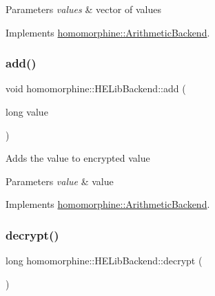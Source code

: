 \begin{DoxyParams}{Parameters}
{\em values} & vector of values \\
\hline
\end{DoxyParams}


Implements \hyperlink{classhomomorphine_1_1_arithmetic_backend_abf4053e05f07e566e9563a75f516daf6}{homomorphine\+::\+Arithmetic\+Backend}.

\mbox{\label{classhomomorphine_1_1_h_e_lib_backend_a6cc00dcfc209206e67c7237934cb8d82}} 
\subsubsection{\texorpdfstring{add()}{add()}\hspace{0.1cm}{\footnotesize\ttfamily [2/2]}}
{\footnotesize\ttfamily void homomorphine\+::\+H\+E\+Lib\+Backend\+::add (\begin{DoxyParamCaption}\item[{long}]{value }\end{DoxyParamCaption})\hspace{0.3cm}{\ttfamily [virtual]}}

Adds the value to encrypted value


\begin{DoxyParams}{Parameters}
{\em value} & value \\
\hline
\end{DoxyParams}


Implements \hyperlink{classhomomorphine_1_1_arithmetic_backend_aa1c88ebc894527a72a9fdbd35ca14204}{homomorphine\+::\+Arithmetic\+Backend}.

\mbox{\label{classhomomorphine_1_1_h_e_lib_backend_a2cd3ebc5a3332100e6cb24480262c395}} 
\subsubsection{\texorpdfstring{decrypt()}{decrypt()}}
{\footnotesize\ttfamily long homomorphine\+::\+H\+E\+Lib\+Backend\+::decrypt (\begin{DoxyParamCaption}{ }\end{DoxyParamCaption})\hspace{0.3cm}{\ttfamily [virtual]}}

